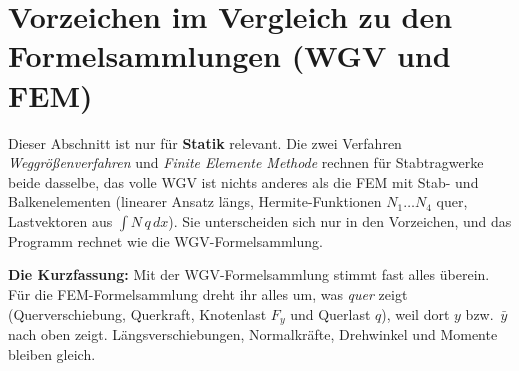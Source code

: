\section{Vorzeichen im Vergleich zu den Formelsammlungen (WGV und FEM)}\label{sec:wgv-vorzeichen}

Dieser Abschnitt ist nur für \textbf{Statik} relevant. Die zwei Verfahren
\emph{Weggrößenverfahren} und \emph{Finite Elemente Methode} rechnen für Stabtragwerke beide
dasselbe, das volle WGV ist nichts anderes als die FEM mit Stab- und Balkenelementen (linearer Ansatz längs, Hermite-Funktionen
$N_1 \dots N_4$ quer, Lastvektoren aus $\int N\,q\,dx$). Sie unterscheiden sich nur in den
Vorzeichen, und das Programm rechnet wie die WGV-Formelsammlung.

\textbf{Die Kurzfassung:} Mit der WGV-Formelsammlung stimmt fast alles überein. Für die
FEM-Formelsammlung dreht ihr alles um, was \emph{quer} zeigt (Querverschiebung, Querkraft,
Knotenlast $F_y$ und Querlast $q$), weil dort $y$ bzw.\ $\bar y$ nach oben zeigt.
Längsverschiebungen, Normalkräfte, Drehwinkel und Momente bleiben gleich.

